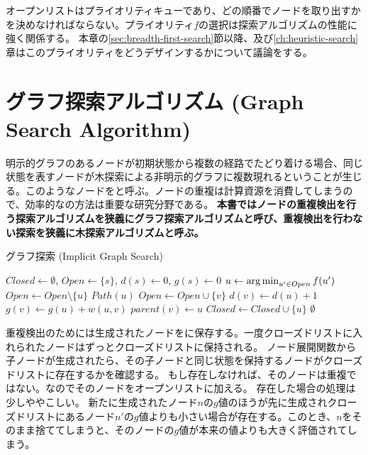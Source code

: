 オープンリストはプライオリティキューであり、どの順番でノードを取り出すかを決めなければならない。プライオリティ$f$の選択は探索アルゴリズムの性能に強く関係する。
本章の\ref{sec:breadth-first-search}節以降、及び\ref{ch:heuristic-search}章はこのプライオリティをどうデザインするかについて議論をする。



\section{グラフ探索アルゴリズム (Graph Search Algorithm)}
\label{sec:graph-search-algorithm}


明示的グラフのあるノードが初期状態から複数の経路でたどり着ける場合、同じ状態を表すノードが木探索による非明示的グラフに複数現れるということが生じる。このようなノードをと呼ぶ。ノードの重複は計算資源を消費してしまうので、効率的なの方法は重要な研究分野である。
{\bf 本書ではノードの重複検出を行う探索アルゴリズムを狭義にグラフ探索アルゴリズムと呼び、重複検出を行わない探索を狭義に木探索アルゴリズムと呼ぶ。}


\begin{algorithm}[tbh]
\caption{グラフ探索 (Implicit Graph Search)}
\label{alg:implicit-graph-search}
	$Closed \leftarrow \emptyset$, $Open \leftarrow \{s\}$, $d(s) \leftarrow 0$, $g(s) \leftarrow 0$\;
	 {
                $u \leftarrow \operatorname*{arg\,min}_{u' \in Open} f(u')$ \;
		$Open \leftarrow Open \setminus \{u\} $\;
		 {
			\Return $Path(u)$\;
		}
		 {
		   {
                    $Open \leftarrow Open \cup \{v\}$\;
		    $d(v) \leftarrow d(u) + 1$\;
		    $g(v) \leftarrow g(u) + w(u, v)$\;
                    $parent(v) \leftarrow u$\;
                  }
		   {
                    $Closed \leftarrow Closed \cup \{u\}$\;
                  }
		}
 	}
	\Return $\emptyset$\;
\end{algorithm}


重複検出のためには生成されたノードをに保存する。一度クローズドリストに入れられたノードはずっとクローズドリストに保持される。
ノード展開関数から子ノードが生成されたら、その子ノードと同じ状態を保持するノードがクローズドリストに存在するかを確認する。
もし存在しなければ、そのノードは重複ではない。なのでそのノードをオープンリストに加える。
存在した場合の処理は少しややこしい。
新たに生成されたノード$n$の$g$値のほうが先に生成されクローズドリストにあるノード$n'$の$g$値よりも小さい場合が存在する。このとき、$n$をそのまま捨ててしまうと、そのノードの$g$値が本来の値よりも大きく評価されてしまう。

